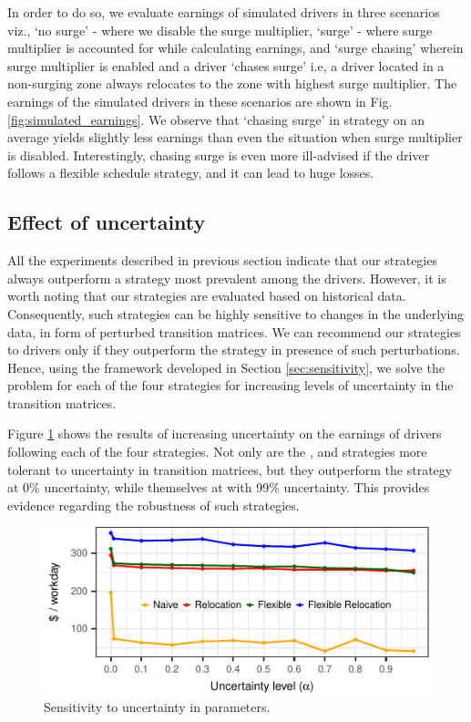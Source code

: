 In order to do so, we evaluate earnings of simulated drivers in three scenarios viz., `no surge' - where we disable the surge multiplier, `surge' - where surge multiplier is accounted for while calculating earnings, and `surge chasing' wherein surge multiplier is enabled and a driver `chases surge' i.e, a driver located in a non-surging zone always relocates to the zone with highest surge multiplier. The earnings of the simulated drivers in these scenarios are shown in Fig. {\ref{fig:simulated_earnings}}. We observe that `chasing surge' in {\naive} strategy on an average yields slightly less earnings than even the situation when surge multiplier is disabled. Interestingly, chasing surge is even more ill-advised if the driver follows a flexible schedule strategy, and it can lead to huge losses.

\subsection{Effect of uncertainty} 

All the experiments described in previous section indicate that our strategies always outperform a {\naive} strategy most prevalent among the drivers. However, it is worth noting that our strategies are evaluated based on historical data. Consequently, such strategies can be highly sensitive to changes in the underlying data, in form of perturbed transition matrices. We can recommend our strategies to drivers only if they outperform the {\naive} strategy in presence of such perturbations. Hence, using the framework developed in Section \ref{sec:sensitivity}, we solve the {\robustproblem} problem for each of the four strategies for increasing levels of uncertainty in the transition matrices.

Figure \ref{fig:uncertainty_evolution} shows the results of increasing uncertainty on the earnings of drivers following each of the four strategies. Not only are the {\relocation}, {\flexible} and {\relocationflexible} strategies more tolerant to uncertainty in transition matrices, but they outperform the {\naive} strategy at 0\% uncertainty, while themselves at with 99\% uncertainty. This provides evidence regarding the robustness of such strategies.

\begin{figure}[H]
	\centering
	\includegraphics{figures/uncertainty_evolution.pdf}
	\caption{Sensitivity to uncertainty in parameters.}
	\label{fig:uncertainty_evolution}
\end{figure}

